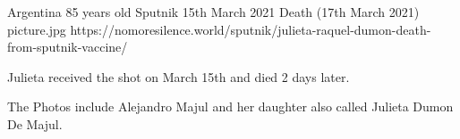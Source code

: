 {Argentina}
{85 years old}
{Sputnik}
{15th March 2021}
{Death (17th March 2021)}
{picture.jpg}
{https://nomoresilence.world/sputnik/julieta-raquel-dumon-death-from-sputnik-vaccine/}
{

Julieta received the shot on March 15th and died 2 days later.

The Photos include Alejandro Majul and her daughter also called Julieta Dumon De
Majul.

}
